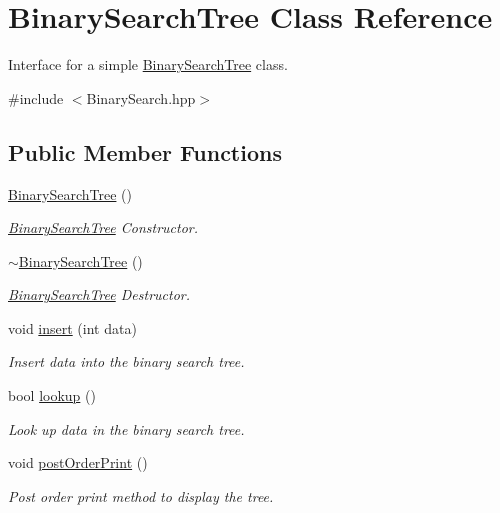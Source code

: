 \hypertarget{classBinarySearchTree}{\section{\-Binary\-Search\-Tree \-Class \-Reference}
\label{classBinarySearchTree}
}


\-Interface for a simple \hyperlink{classBinarySearchTree}{\-Binary\-Search\-Tree} class.  




{\ttfamily \#include $<$\-Binary\-Search.\-hpp$>$}

\subsection*{\-Public \-Member \-Functions}
\begin{DoxyCompactItemize}
\item 
\hyperlink{classBinarySearchTree_a5351a78a161520116785f8eefbb91183}{\-Binary\-Search\-Tree} ()
\begin{DoxyCompactList}\small\item\em \hyperlink{classBinarySearchTree}{\-Binary\-Search\-Tree} \-Constructor. \end{DoxyCompactList}\item 
\hyperlink{classBinarySearchTree_a7e6fd54bec4c539cfcb8404b1ff3f98d}{$\sim$\-Binary\-Search\-Tree} ()
\begin{DoxyCompactList}\small\item\em \hyperlink{classBinarySearchTree}{\-Binary\-Search\-Tree} \-Destructor. \end{DoxyCompactList}\item 
void \hyperlink{classBinarySearchTree_ac0e54b862ccb367169fbdc98a471de5a}{insert} (int data)
\begin{DoxyCompactList}\small\item\em \-Insert data into the binary search tree. \end{DoxyCompactList}\item 
bool \hyperlink{classBinarySearchTree_a0f94f36df5156dc4fcbfdaa1501065ff}{lookup} ()
\begin{DoxyCompactList}\small\item\em \-Look up data in the binary search tree. \end{DoxyCompactList}\item 
void \hyperlink{classBinarySearchTree_a2ec66d45badc37ba8f7f16c70c51ebfc}{post\-Order\-Print} ()
\begin{DoxyCompactList}\small\item\em \-Post order print method to display the tree. \end{DoxyCompactList}\item 

\end{DoxyCompactItemize}
